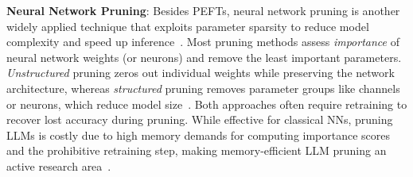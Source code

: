 %
%

\textbf{Neural Network Pruning}:
Besides PEFTs, neural network pruning is another widely applied technique that exploits parameter sparsity to reduce model complexity and speed up inference~\citep{lecun1989optimal, han2015learning, han2017efficient, hoefler2021sparsity}. Most pruning methods assess \emph{importance} of neural network weights (or neurons) and remove the least important parameters. \emph{Unstructured} pruning zeros out individual weights while preserving the network architecture, whereas \emph{structured} pruning removes parameter groups like channels or neurons, which reduce model size~\citep{liu2021group, fang2023depgraph, ma2023llmpruner}. Both approaches often require retraining to recover lost accuracy during pruning. While effective for classical NNs, pruning LLMs is costly due to high memory demands for computing importance scores and the prohibitive retraining step, making memory-efficient LLM pruning an active research area~\citep{frantar2023sparsegpt,sunsimple}.

